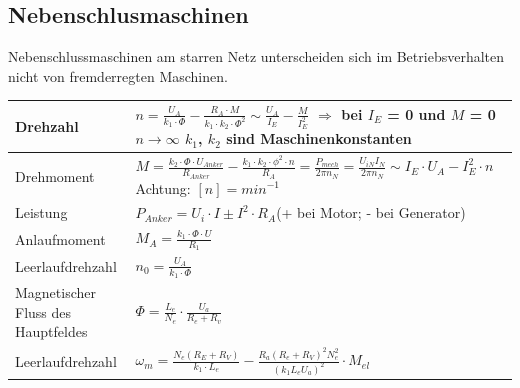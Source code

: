     \subsection{Nebenschlusmaschinen}
    	Nebenschlussmaschinen am starren Netz unterscheiden sich im Betriebsverhalten nicht von fremderregten Maschinen.
    	
    	
        \renewcommand{\arraystretch}{2}
        \begin{tabular}[c]{ | p{6cm} | p{11cm} |}
            \hline
            Drehzahl &
            $ n= \frac{U_A}{k_1 \cdot \Phi} - \frac{R_A \cdot M}{k_1 \cdot k_2 \cdot \Phi^2} \sim \frac{U_A}{I_E} - \frac{M}{I_E^2}$ \newline
            $\Longrightarrow $ bei $I_E$ = 0 und $M$ = 0 $n \rightarrow \infty$ \newline 
            $k_1$, $k_2$ sind Maschinenkonstanten \\
            \hline
            Drehmoment &
            $M=\frac{k_2 \cdot \Phi \cdot U_{Anker}}{R_{Anker}} - \frac{k_1 \cdot k_2 \cdot\phi^2 \cdot n}{R_A} =\frac{P_{mech}}{2\pi n_N}=\frac{U_{iN}I_N}{2\pi n_N}\sim I_E \cdot U_A - I_E ^2 \cdot n$
            \quad Achtung: $[n] = min^{-1}$\\
            \hline
            Leistung &
            $P_{Anker}= U_i \cdot I \pm I^2 \cdot R_A $(+ bei Motor; - bei Generator) \\
            \hline
            Anlaufmoment &
            $M_A = \frac{k_1 \cdot \Phi \cdot U}{R_1}$ \\
            \hline
            Leerlaufdrehzahl &
            $n_0 = \frac{U_A}{k_1 \cdot \Phi}$ \\
            \hline
            Magnetischer Fluss des Hauptfeldes & 
            $\Phi=\frac{L_e}{N_e}\cdot\frac{U_a}{R_e+R_v}$\\
            \hline
            Leerlaufdrehzahl &
            $\omega_m=\frac{N_e\left(R_E+R_V\right)}{k_1\cdot
            L_e}-\frac{R_a\left(R_e+R_V\right)^2N_e^2}{\left(k_1L_eU_a\right)^2}\cdot
            M_{el}$\\
            \hline
        \end{tabular}
        \renewcommand{\arraystretch}{1.3}
        
